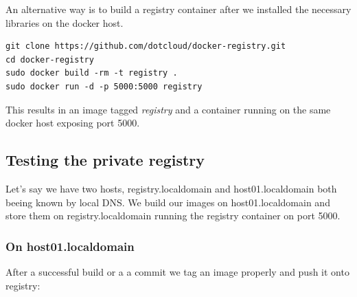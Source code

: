 \documentclass[11pt]{article}
\begin{document}
An alternative way is to build a registry container after we installed the necessary libraries on the docker host.

\begin{verbatim}
git clone https://github.com/dotcloud/docker-registry.git
cd docker-registry
sudo docker build -rm -t registry .
sudo docker run -d -p 5000:5000 registry
\end{verbatim}
This results in an image tagged \emph{registry} and a container running on the same docker host exposing port 5000.
\subsection{Testing the private registry}
\label{sec-3-6}

Let's say we have two hosts, registry.localdomain and host01.localdomain both beeing known by local DNS. We build our images on host01.localdomain and store them on registry.localdomain running the registry container on port 5000. 
\subsubsection{On host01.localdomain}
\label{sec-3-6-1}

After a successful build or a a commit we tag an image properly and push it onto registry: 
\end{document}
